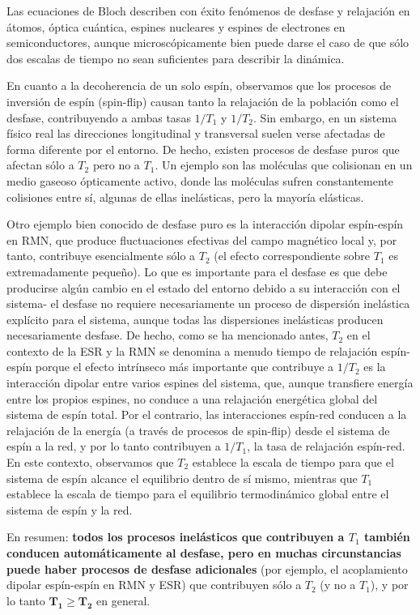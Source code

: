     Las ecuaciones de Bloch describen con éxito fenómenos de desfase y relajación en átomos, óptica cuántica, espines nucleares y espines de electrones en semiconductores, aunque microscópicamente bien puede darse el caso de que sólo dos escalas de tiempo no sean suficientes para describir la dinámica. 
    
    En cuanto a la decoherencia de un solo espín, observamos que los procesos de inversión de espín (spin-flip) causan tanto la relajación de la población como el desfase, contribuyendo a ambas tasas $1/T_1$ y $1/T_2$. Sin embargo, en un sistema físico real las direcciones longitudinal y transversal suelen verse afectadas de forma diferente por el entorno. De hecho, existen procesos de desfase puros que afectan sólo a $T_2$ pero no a $T_1$. Un ejemplo son las moléculas que colisionan en un medio gaseoso ópticamente activo, donde las moléculas sufren constantemente colisiones entre sí, algunas de ellas inelásticas, pero la mayoría elásticas.
    
    Otro ejemplo bien conocido de desfase puro es la interacción dipolar espín-espín en RMN, que produce fluctuaciones efectivas del campo magnético local y, por tanto, contribuye esencialmente sólo a $T_2$ (el efecto correspondiente sobre $T_1$ es extremadamente pequeño). Lo que es importante para el desfase es que debe producirse algún cambio en el estado del entorno debido a su interacción con el sistema- el desfase no requiere necesariamente un proceso de dispersión inelástica explícito para el sistema, aunque todas las dispersiones inelásticas producen necesariamente desfase. De hecho, como se ha mencionado antes, $T_2$ en el contexto de la ESR y la RMN se denomina a menudo tiempo de relajación espín-espín porque el efecto intrínseco más importante que contribuye a $1/T_2$ es la interacción dipolar entre varios espines del sistema, que, aunque transfiere energía entre los propios espines, no conduce a una relajación energética global del sistema de espín total. Por el contrario, las interacciones espín-red conducen a la relajación de la energía (a través de procesos de spin-flip) desde el sistema de espín a la red, y por lo tanto contribuyen a $1/T_1$, la tasa de relajación espín-red. En este contexto, observamos que $T_2$ establece la escala de tiempo para que el sistema de espín alcance el equilibrio dentro de sí mismo, mientras que $T_1$ establece la escala de tiempo para el equilibrio termodinámico global entre el sistema de espín y la red. 
    
    En resumen: \textbf{todos los procesos inelásticos que contribuyen a $T_1$ también conducen automáticamente al desfase, pero en muchas circunstancias puede haber procesos de desfase adicionales} (por ejemplo, el acoplamiento dipolar espín-espín en RMN y ESR) que contribuyen sólo a $T_2$ (y no a $T_1$), y por lo tanto $\bm{T_1 \geq T_2}$ en general.


